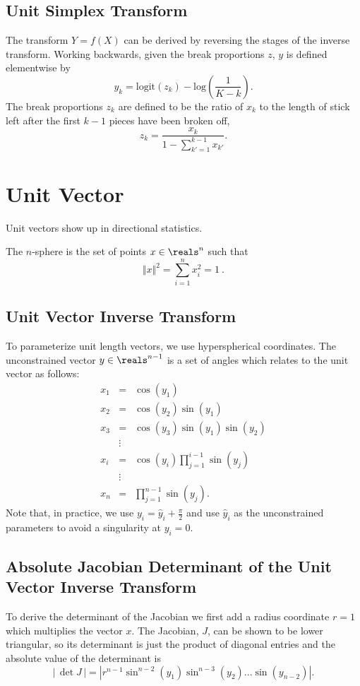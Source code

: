 \subsection{Unit Simplex Transform}

The transform $Y = f(X)$ can be derived by reversing the stages of the
inverse transform.  Working backwards, given the break proportions
$z$, $y$ is defined elementwise by
%
\[
y_k
= \mbox{logit}(z_k)
- \mbox{log}\left(
   \frac{1}{K-k}
   \right)
.
\]
%
The break proportions $z_k$ are defined to be the ratio of $x_k$ to
the length of stick left after the first $k-1$ pieces have been broken
off,
%
\[
z_k
= \frac{x_k}
       {1 - \sum_{k' = 1}^{k-1} x_{k'}}
.
\]

\section{Unit Vector}
Unit vectors show up in directional statistics.

The $n$-sphere is the set of points $x \in \reals^n$ such that
\[
\Vert x \Vert^2 = \sum_{i=1}^n x_i^2 = 1\ .
\]

\subsection{Unit Vector Inverse Transform}

To parameterize unit length vectors, we use hyperspherical coordinates.
The unconstrained vector $y \in \reals^{n-1}$ is a set of angles which
relates to the unit vector as follows:
\begin{eqnarray*}
x_1 & = & \cos(y_1) \\
x_2 & = & \cos(y_2) \sin(y_1) \\
x_3 & = & \cos(y_3) \sin(y_1) \sin(y_2) \\
& \vdots & \\
x_i & = & \cos(y_i) \prod_{j=1}^{i-1} \sin(y_j) \\
& \vdots & \\
x_n & = & \prod_{j=1}^{n-1} \sin(y_j).
\end{eqnarray*}
Note that, in practice, we use $y_i = \hat{y}_i + \frac{\pi}{2}$ and use $\hat{y}_i$ as the unconstrained parameters to avoid a singularity at
$y_i = 0$.


\subsection{Absolute Jacobian Determinant of the Unit Vector
  Inverse Transform}
To derive the determinant of the Jacobian we first add a radius coordinate
$r=1$ which multiplies the vector $x$.
The Jacobian, $J$, can be shown to be lower triangular, so its
determinant is just the product of diagonal entries and the
absolute value of the determinant is
\[
\left| \, \det J \, \right| = \left|r^{n-1} \sin^{n-2}(y_1) \sin^{n-3}(y_2) ... \sin(y_{n-2})\right| .
\]


